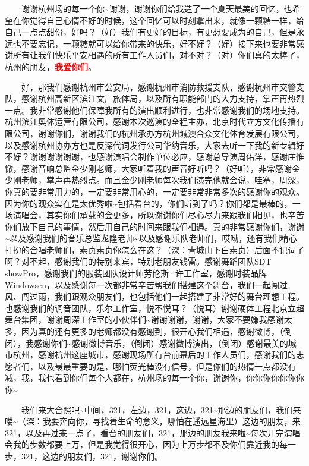 \documentclass[]{ctexbook}
\begin{document}
  谢谢杭州场的每一个你\textasciitilde 谢谢，谢谢你们给我造了一个夏天最美的回忆，也希望在你觉得自己心情不好的时候，这个回忆可以时刻拿出来，就像一颗糖一样，给自己一点点甜份，好吗？（好）我们有更好的目标，有更想要成为的自己，但是永远也不要忘记，一颗糖就可以给你带来的快乐，好不好？（好）接下来也要非常感谢所有让我们快乐平安相遇的所有工作人员们，对不对？（对）你们真的太棒了，杭州的朋友，\textbf{\textcolor{red}{我爱你们}}。

  好，那我们感谢杭州市公安局，感谢杭州市消防救援支队，感谢杭州市交警支队，感谢杭州高新区滨江文广旅体局，以及所有职能部门的大力支持，掌声再热烈一点。我非常感谢他们保障我所有的演出顺利进行，也非常感谢我们的场地支持。杭州滨江奥体运营有限公司，感谢本次巡演的全程主办，北京时代立方文化传播有限公司，谢谢你们，谢谢我们的杭州承办方杭州城澳合众文化体育发展有限公司，以及感谢杭州协办方也是反深代词发行公司华纳音乐，大家去听一下我的新专辑好不好？谢谢谢谢谢谢，也感谢演唱会制作单位必应，感谢总导演周佑洋，感谢庄惟惞，感谢音响总监金少刚老师，大家听着我的声音好听吗？（好听），非常感谢金少刚老师，掌声再热烈点。而且金少刚老师每次我们演完他就会说，哇塞，周深，你真的要非常用力的，一定要非常用心的，一定要非常非常多次的感谢你的观众。因为你的观众实在是太优秀啦\textasciitilde 包括看台的，你们听到了吗？你们都是最棒的，一场演唱会，其实你们承载的会更多，所以谢谢你们尽心尽力来跟我们相见，也辛苦你们放下自己的事情，然后用自己的时间来跟我们相遇。真的非常感谢你们，谢谢\textasciitilde 以及感谢我们的音乐总监龙隆老师\textasciitilde 以及感谢乐队老师们，哎呦，还有我们精心打扮的合唱老师们，素贞素贞你怎么在这？（深：青城山下白素贞）后面不记词了啊？对不起，感谢我们的特别来宾，特别老朋友钱雷。感谢舞蹈团队SDT showPro，感谢我们的服装团队设计师劳伦斯·许工作室，感谢时装品牌 Windowsen，以及感谢每一次都非常辛苦帮我们搭建这个舞台，我们一起闯过风、闯过雨，我们跟观众朋友们，也包括他们一起搭建了非常好的舞台理想工程。也感谢我们的调音团队，乐尔工作室，悦不悦耳？（悦耳）谢谢硬体工程北京立超舞台集团，谢谢周深工作室的小伙伴们\textasciitilde 谢谢谢谢，谢谢，大家不要嫌我感谢太多，因为真的还有更多的老师都没有感谢到，很开心我们相遇，感谢微博，（倒闭），我感谢你们\textasciitilde 感谢微博音乐，（倒闭）感谢微博演出，（倒闭）感谢最美的城市杭州，感谢杭州这座城市，感谢现场所有台前幕后的工作人员们，感谢我们的志愿者们，以及最最重要的是，哪怕荧光棒没有信号，但是你们的热情一点都没有减，我，我也看到你们每个人都在，杭州场的每一个你，谢谢你，你你你你你你你你\textasciitilde{}

  我们来大合照吧\textasciitilde 中间，321，左边，321，这边，321\textasciitilde 那边的朋友们，我们来喽\textasciitilde（深：我要奔向你，寻找着生命的意义，哪怕在遥远星海里）这边的朋友，来321，以及再过来一点了，看台的朋友们，321，那边的朋友我来啦\textasciitilde 每次开完演唱会我的步数都要上万，但是我觉得很开心，因为上万步都不及你们靠近我的每一步，321，这边的朋友们，321，谢谢你们。
\end{document}
